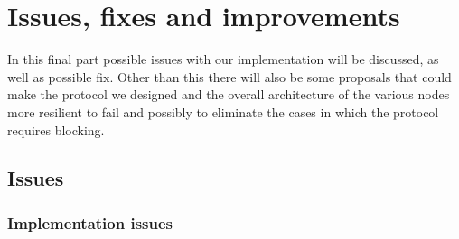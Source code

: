 \section{Issues, fixes and improvements}
In this final part possible issues with our implementation will be discussed, as well as possible fix. Other than this there will also be some proposals that could make the protocol we designed and the overall architecture of the various nodes more resilient to fail and possibly to eliminate the cases in which the protocol requires blocking.

\subsection{Issues}

\subsubsection{Implementation issues}

